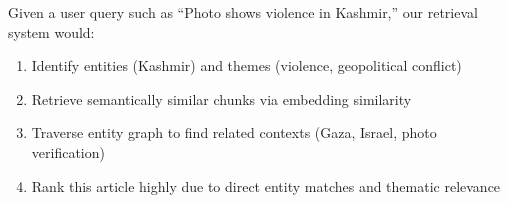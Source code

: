 \documentclass[10pt]{article}
\begin{document}
Given a user query such as ``Photo shows violence in Kashmir,'' our retrieval system would:
\begin{enumerate}[itemsep=3pt]
    \item Identify entities (Kashmir) and themes (violence, geopolitical conflict)
    \item Retrieve semantically similar chunks via embedding similarity
    \item Traverse entity graph to find related contexts (Gaza, Israel, photo verification)
    \item Rank this article highly due to direct entity matches and thematic relevance
\end{enumerate}
\end{document}

